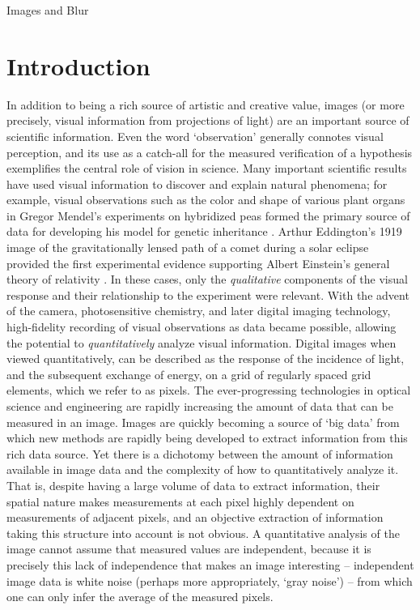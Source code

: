 \setlength{\parindent}{2ex}
\begin{chapter}{Images and Blur}\label{chapter:introduction}
  \section{Introduction}
  In addition to being a rich source of artistic and creative value, images (or more precisely, visual information from projections of light) are an important source of scientific information.
  Even the word `observation' generally connotes visual perception, and its use as a catch-all for the measured verification of a hypothesis exemplifies the central role of vision in science.
  Many important scientific results have used visual information to discover and explain natural phenomena; for example, visual observations such as the color and shape of various plant organs in Gregor Mendel's experiments on hybridized peas formed the primary source of data for developing his model for genetic inheritance \citep{magner2002}.
  Arthur Eddington's 1919 image of the gravitationally lensed path of a comet during a solar eclipse provided the first experimental evidence supporting Albert Einstein's general theory of relativity \citep{eddington1920}.
  In these cases, only the \emph{qualitative} components of the visual response and their relationship to the experiment were relevant.
  With the advent of the camera, photosensitive chemistry, and later digital imaging technology, high-fidelity recording of visual observations as data became possible, allowing the potential to \emph{quantitatively} analyze visual information.
  Digital images when viewed quantitatively, can be described as the response of the incidence of light, and the subsequent exchange of energy, on a grid of regularly spaced grid elements, which we refer to as pixels.
  The ever-progressing technologies in optical science and engineering are rapidly increasing the amount of data that can be measured in an image.
  Images are quickly becoming a source of `big data' from which new methods are rapidly being developed to extract information from this rich data source.
  Yet there is a dichotomy between the amount of information available in image data and the complexity of how to quantitatively analyze it.
That is, despite having a large volume of data to extract information, their spatial nature makes measurements at each pixel highly dependent on measurements of adjacent pixels, and an objective extraction of information taking this structure into account is not obvious.
  A quantitative analysis of the image cannot assume that measured values are independent, because it is precisely this lack of independence that makes an image interesting -- independent image data is white noise (perhaps more appropriately, `gray noise') -- from which one can only infer the average of the measured pixels.


\end{chapter}
